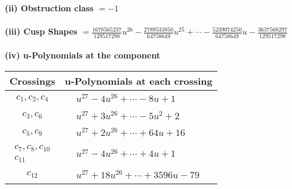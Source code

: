 \documentclass[1p]{elsarticle_modified}
\theoremstyle{definition}
\begin{document}
\flushleft \textbf{(ii) Obstruction class $= -1$}\\~\\
\flushleft \textbf{(iii) Cusp Shapes $= \frac{1678565237}{129517298} u^{26}-\frac{2789533850}{64758649} u^{25}+\cdots-\frac{5239074250}{64758649} u-\frac{3637568297}{129517298}$}\\~\\
\newpage\renewcommand{\arraystretch}{1}
\flushleft \textbf{(iv) u-Polynomials at the component}\newline \\
\begin{tabular}{m{50pt}|m{274pt}}
Crossings & \hspace{64pt}u-Polynomials at each crossing \\
\hline $$\begin{aligned}c_{1},c_{2},c_{4}\end{aligned}$$&$\begin{aligned}
&u^{27}-4 u^{26}+\cdots-8 u+1
\end{aligned}$\\
\hline $$\begin{aligned}c_{3},c_{6}\end{aligned}$$&$\begin{aligned}
&u^{27}+3 u^{26}+\cdots-5 u^2+2
\end{aligned}$\\
\hline $$\begin{aligned}c_{5},c_{9}\end{aligned}$$&$\begin{aligned}
&u^{27}+2 u^{26}+\cdots+64 u+16
\end{aligned}$\\
\hline $$\begin{aligned}c_{7},c_{8},c_{10}\\c_{11}\end{aligned}$$&$\begin{aligned}
&u^{27}-4 u^{26}+\cdots+4 u+1
\end{aligned}$\\
\hline $$\begin{aligned}c_{12}\end{aligned}$$&$\begin{aligned}
&u^{27}+18 u^{26}+\cdots+3596 u-79
\end{aligned}$\\
\hline
\end{tabular}\\~\\
\newpage\renewcommand{\arraystretch}{1}
\end{document}
